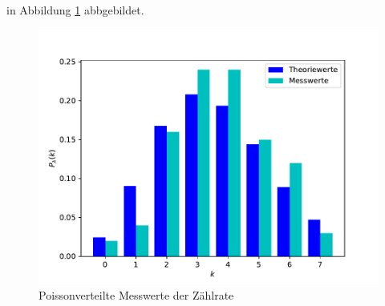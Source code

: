     in Abbildung \ref{fig:plot6} abbgebildet.

    \begin{figure} [H]
      \centering
      \includegraphics[scale=0.8]{content/poisson.pdf}
      \caption{Poissonverteilte Messwerte der Zählrate}
      \label{fig:plot6}
    \end{figure}
